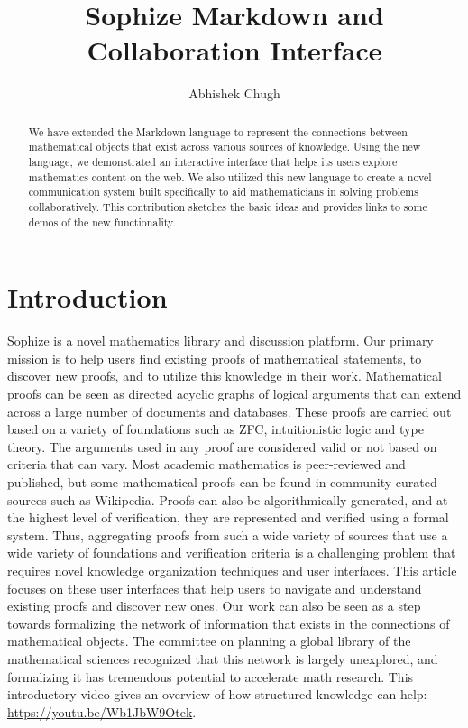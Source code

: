 \documentclass[a4paper]{article}
\title{Sophize Markdown and Collaboration Interface }
\author{ Abhishek Chugh }
\begin{document}
\maketitle

\begin{abstract}
We have extended the Markdown language to represent the connections between mathematical objects that exist across various sources of knowledge. Using the new language, we demonstrated an interactive interface that helps its users explore mathematics content on the web. We also utilized this new language to create a novel communication system built specifically to aid mathematicians in solving problems collaboratively. This contribution sketches the basic ideas and provides links to some demos of the new functionality.

\end{abstract}

\vskip 32pt

\section{Introduction}

Sophize is a novel mathematics library and discussion platform. Our primary mission is to help users find existing proofs of mathematical statements, to discover new proofs, and to utilize this knowledge in their work. Mathematical proofs can be seen as directed acyclic graphs of logical arguments that can extend across a large number of documents and databases. These proofs are carried out based on a variety of foundations such as ZFC, intuitionistic logic and type theory. The arguments used in any proof are considered valid  or not based on criteria that can vary. Most academic mathematics is peer-reviewed and published, but some mathematical proofs can be found in community curated sources such as Wikipedia. Proofs can also be algorithmically generated, and at the highest level of verification, they are represented and verified using a formal system. Thus, aggregating proofs from such a wide variety of sources that use a wide variety of foundations and verification criteria is a challenging problem that requires novel knowledge organization techniques and user interfaces. This article focuses on these user interfaces that help users to navigate and understand existing proofs and discover new ones.  Our work can also be seen as a step towards formalizing the network of information that exists in the connections of mathematical objects. The committee on planning a global library of the mathematical sciences recognized that this network is largely unexplored, and formalizing it has tremendous potential to accelerate math research\cite{sciences2014developing}. This introductory video gives an overview of how structured knowledge can help: \url{https://youtu.be/Wb1JbW9Otek}.
\end{document}
